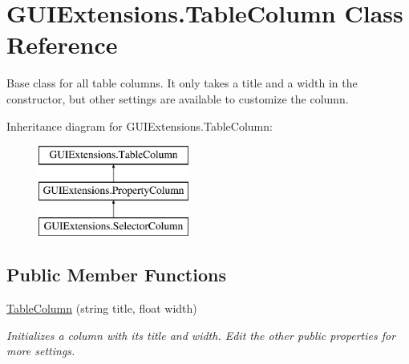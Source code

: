 \hypertarget{class_g_u_i_extensions_1_1_table_column}{}\section{G\+U\+I\+Extensions.\+Table\+Column Class Reference}
\label{class_g_u_i_extensions_1_1_table_column}


Base class for all table columns. It only takes a title and a width in the constructor, but other settings are available to customize the column.  


Inheritance diagram for G\+U\+I\+Extensions.\+Table\+Column\+:\begin{figure}[H]
\begin{center}
\leavevmode
\includegraphics[height=3.000000cm]{class_g_u_i_extensions_1_1_table_column}
\end{center}
\end{figure}
\subsection*{Public Member Functions}
\begin{DoxyCompactItemize}
\item 
\mbox{\hyperlink{class_g_u_i_extensions_1_1_table_column_a27389bffc8435c64dbdc03c96d396383}{Table\+Column}} (string title, float width)
\begin{DoxyCompactList}\small\item\em Initializes a column with its title and width. Edit the other public properties for more settings. \end{DoxyCompactList}\end{DoxyCompactItemize}
